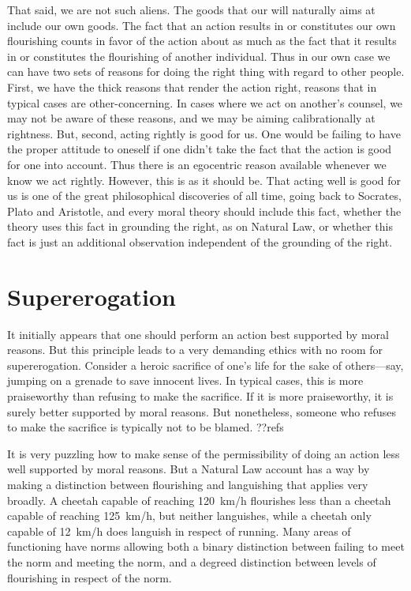 That said, we are not such aliens. The goods that our will naturally aims at include our own goods. The fact that an action 
results in or constitutes our own flourishing counts in favor of the action about as much as the fact that it results in or constitutes the
flourishing of another individual. Thus in our own case we can have two sets of reasons for doing the right thing with regard to other
people. First, we have the thick reasons that render the action right, reasons that in typical cases are other-concerning. In cases where
we act on another's counsel, we may not be aware of these reasons, and we may be aiming calibrationally at rightness. But, second, acting
rightly is good for us. One would be failing to have the proper attitude to oneself if one didn't take the fact that the action is good
for one into account. Thus there is an egocentric reason available whenever we know we act rightly. However, this is as it should be.
That acting well is good for us is one of the great philosophical discoveries of all time, going back to Socrates, Plato and Aristotle,
and every moral theory should include this fact, whether the theory uses this fact in grounding the right, as on Natural Law, or whether
this fact is just an additional observation independent of the grounding of the right. 

\section{Supererogation}\label{sec:superero}
It initially appears that one should perform an action best supported by moral reasons. But this principle
leads to a very demanding ethics with no room for supererogation. Consider a heroic sacrifice of one's life for
the sake of others---say, jumping on a grenade to save innocent lives. In typical cases, this is more praiseworthy 
than refusing to make the sacrifice. If it is more praiseworthy, it is surely better supported by moral reasons. 
But nonetheless, someone who refuses to make the sacrifice is typically not to be blamed. ??refs

It is very puzzling how to make sense of the permissibility of doing an action less well supported by moral reasons. 
But a Natural Law account has a way by making a distinction between flourishing and languishing that applies very
broadly. A cheetah capable of reaching 120~km/h flourishes less than a cheetah capable of reaching 125~km/h, but 
neither languishes, while a cheetah only capable of 12~km/h does languish in respect of running. Many areas of 
functioning have norms allowing both a binary distinction between failing to meet the norm and meeting the norm,
and a degreed distinction between levels of flourishing in respect of the norm. 

